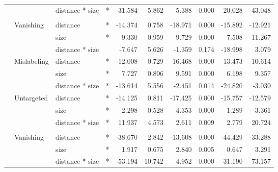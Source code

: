 \begin{longtable}[t]{llllrrrrrr}
\cmidrule{3-10}\nopagebreak
\hspace{1em} &  & distance * size & * & 31.584 & 5.862 & 5.388 & 0.000 & 20.028 & 43.048\\
\cmidrule{1-10}\pagebreak[0]
\addlinespace[0.3em]
\multicolumn{10}{l}{\textbf{SSD}}\\
\hspace{1em} & Vanishing & distance & * & -14.374 & 0.758 & -18.971 & 0.000 & -15.892 & -12.921\\
\cmidrule{3-10}\nopagebreak
\hspace{1em} &  & size & * & 9.330 & 0.959 & 9.729 & 0.000 & 7.508 & 11.267\\
\cmidrule{3-10}\nopagebreak
\hspace{1em} &  & distance * size &  & -7.647 & 5.626 & -1.359 & 0.174 & -18.998 & 3.079\\
\cmidrule{2-10}\nopagebreak
\hspace{1em} & Mislabeling & distance & * & -12.008 & 0.729 & -16.468 & 0.000 & -13.473 & -10.614\\
\cmidrule{3-10}\nopagebreak
\hspace{1em} &  & size & * & 7.727 & 0.806 & 9.591 & 0.000 & 6.198 & 9.357\\
\cmidrule{3-10}\nopagebreak
\hspace{1em} &  & distance * size & * & -13.614 & 5.556 & -2.451 & 0.014 & -24.820 & -3.030\\
\cmidrule{2-10}\nopagebreak
\hspace{1em} & Untargeted & distance & * & -14.125 & 0.811 & -17.425 & 0.000 & -15.757 & -12.579\\
\cmidrule{3-10}\nopagebreak
\hspace{1em} &  & size & * & 2.298 & 0.528 & 4.353 & 0.000 & 1.289 & 3.361\\
\cmidrule{3-10}\nopagebreak
\hspace{1em} &  & distance * size & * & 11.937 & 4.573 & 2.611 & 0.009 & 2.779 & 20.724\\
\cmidrule{1-10}\pagebreak[0]
\addlinespace[0.3em]
\multicolumn{10}{l}{\textbf{RetinaNet}}\\
\hspace{1em} & Vanishing & distance & * & -38.670 & 2.842 & -13.608 & 0.000 & -44.429 & -33.288\\
\cmidrule{3-10}\nopagebreak
\hspace{1em} &  & size & * & 1.917 & 0.675 & 2.840 & 0.005 & 0.647 & 3.291\\
\cmidrule{3-10}\nopagebreak
\hspace{1em} &  & distance * size & * & 53.194 & 10.742 & 4.952 & 0.000 & 31.190 & 73.157\\

\end{longtable}
